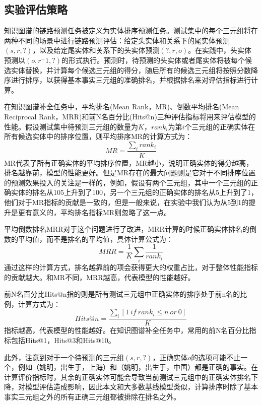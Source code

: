 \subsection{实验评估策略}

知识图谱的链路预测任务被定义为实体排序预测任务。测试集中的每个三元组将在两种不同的场景中进行链路预测评估：给定头实体和关系下的尾实体预测$(s,r,?)$，以及给定尾实体和关系下的头实体预测$(?,r,o)$。在实践中，头实体预测以$(o,r^-1,?)$的形式执行。预测时，待预测的头实体或者尾实体将被每个候选实体替换，并计算每个候选三元组的得分，随后所有的候选三元组将按照分数降序进行排序，以获得基本事实三元组的准确排名，并根据排名来对评估指标进行计算。

在知识图谱补全任务中，平均排名(Mean Rank，MR)、倒数平均排名(Mean Reciprocal Rank，MRR)和前N名百分比(Hits@n)三种评估指标将用来评估模型的性能。假设测试集中待预测三元组的数量为$K$，$rank_i$为第$i$个三元组的正确实体在所有候选实体中的排序位置，则平均排序MR的计算方式为：
\begin{equation}
    MR = \frac{\sum_i rank_i}{K}
\end{equation}
MR代表了所有正确实体的平均排序位置，MR越小，说明正确实体的得分越高，排名越靠前，模型的性能更好。但是MR存在的最大问题则是它对于不同排序位置的预测效果投入的关注是一样的，例如，假设有两个三元组，其中一个三元组的正确实体的排名从105上升到了100，另一个三元组的正确实体的排名从5上升到了1，他们对于MR指标的贡献是一致的，但是一般来说，在实验中我们认为从5到1的提升是更有意义的，平均排名指标MR则忽略了这一点。

平均倒数排名MRR对于这个问题进行了改进，MRR计算的时候正确实体排名的倒数的平均值，而不是排名的平均值，具体计算公式为：
\begin{equation}
    MRR = \frac{1}{K} \sum_i \frac{1}{rank_i}
\end{equation}
通过这样的计算方式，排名越靠前的项会获得更大的权重占比，对于整体性能指标的贡献越大。和MR不同，MRR越高，代表模型的性能越好。

前N名百分比Hits@n指的则是所有测试三元组中正确实体的排序处于前n名的比例，计算方式为：
\begin{equation}
    Hits@n = \frac{\sum_i \left[1 \ if \ rank_i \leq n \ or \ 0\right] }{K}
\end{equation}
指标越高，代表模型的性能越好。在知识图谱补全任务中，常用的前N名百分比指标包括Hits@1，Hits@3和Hits@10。

此外，注意到对于一个待预测的三元组$(s,r,?)$，正确实体$o$的选项可能不止一个，例如（姚明，出生于，上海）和（姚明，出生于，中国）都是正确的事实。在计算评价指标时，其余的正确实体可能会导致当前测试三元组中的正确实体排名下降，对模型评估造成影响，因此本文和大多数基线模型类似，计算排序时除了基本事实三元组之外的所有正确三元组都被排除在排名之外。


